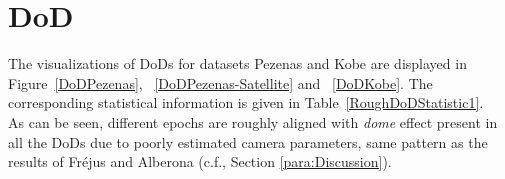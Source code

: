 \begin{figure}[htbp]
\begin{center}
		\label{MatchVizKobe1991DSM}
	\end{center}
\end{figure} 

\section{\ac{DoD}}
\label{sec:RoughDoD}
The visualizations of \ac{DoD}s for datasets Pezenas and Kobe are displayed in Figure~\ref{DoDPezenas}, ~\ref{DoDPezenas-Satellite} and ~\ref{DoDKobe}. The corresponding statistical information is given in Table~\ref{RoughDoDStatistic1}.\\
As can be seen, different epochs are roughly aligned with \textit{dome} effect present in all the \ac{DoD}s due to poorly estimated camera parameters, same pattern as the results of Fr{\'e}jus and Alberona (c.f., Section \ref{para:Discussion}).

